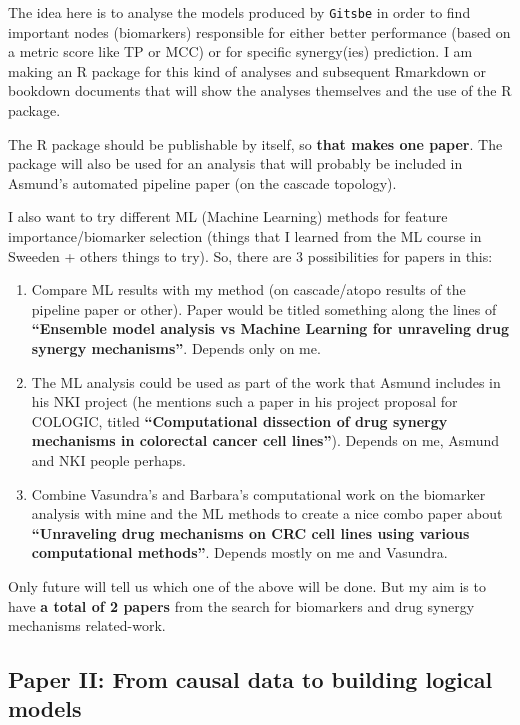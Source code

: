 \documentclass[12pt,]{book}
\providecommand{\tightlist}{%
  \setlength{\itemsep}{0pt}\setlength{\parskip}{0pt}}
\begin{document}
The idea here is to analyse the models produced by \texttt{Gitsbe} in order to find
important nodes (biomarkers) responsible for either better performance (based on a metric score
like TP or MCC) or for specific synergy(ies) prediction. I am making an R package for this kind
of analyses and subsequent Rmarkdown or bookdown documents that will show the
analyses themselves and the use of the R package.

The R package should be publishable by itself, so \textbf{that makes one paper}.
The package will also be used for an analysis that will probably be included in
Asmund's automated pipeline paper (on the cascade topology).

I also want to try different ML (Machine Learning) methods for feature importance/biomarker
selection (things that I learned from the ML course in Sweeden + others things to try). So, there are 3 possibilities for papers in this:

\begin{enumerate}
\def\labelenumi{\arabic{enumi}.}
\tightlist
\item
  Compare ML results with my method (on cascade/atopo results of the pipeline
  paper or other). Paper would be titled something along the lines of
  \textbf{``Ensemble model analysis vs Machine Learning for unraveling drug synergy mechanisms''}.
  Depends only on me.
\item
  The ML analysis could be used as part of the work that Asmund includes in his NKI project (he mentions such a paper in his project proposal for COLOGIC, titled \textbf{``Computational dissection of drug synergy mechanisms in colorectal cancer cell lines''}). Depends on me, Asmund and NKI
  people perhaps.
\item
  Combine Vasundra's and Barbara's computational work on the biomarker analysis with mine and the ML methods to create a nice combo paper about
  \textbf{``Unraveling drug mechanisms on CRC cell lines using various computational methods''}.
  Depends mostly on me and Vasundra.
\end{enumerate}

Only future will tell us which one of the above will be done. But my
aim is to have \textbf{a total of 2 papers} from the search for biomarkers and drug synergy mechanisms related-work.

\hypertarget{paper-ii-from-causal-data-to-building-logical-models}{%
\subsection{Paper II: From causal data to building logical models}\label{paper-ii-from-causal-data-to-building-logical-models}}
\end{document}
